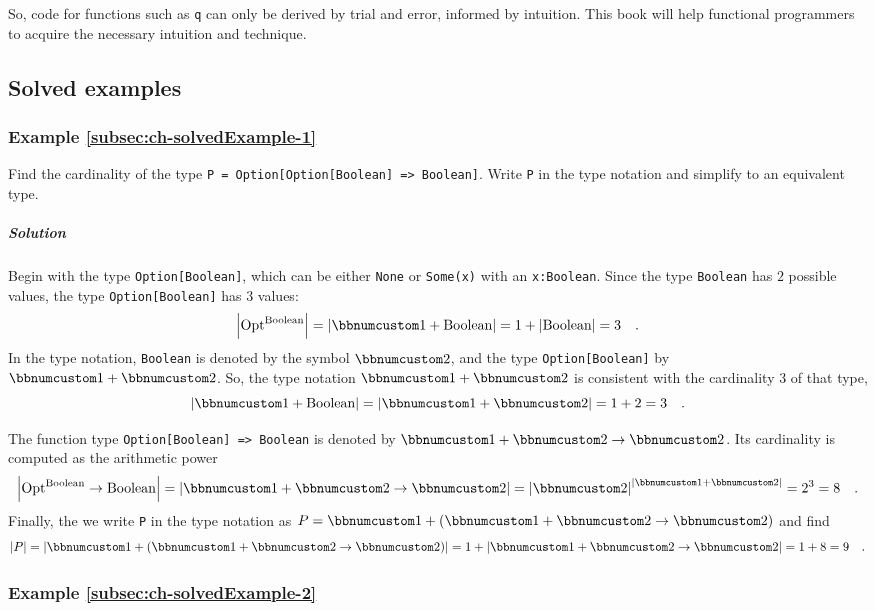 So, code for functions such as \lstinline!q! can only be derived
by trial and error, informed by intuition. This book will help functional
programmers to acquire the necessary intuition and technique.

\subsection{Solved examples}

\subsubsection{Example \label{subsec:ch-solvedExample-1}\ref{subsec:ch-solvedExample-1}}

Find the cardinality of the type \lstinline!P = Option[Option[Boolean] => Boolean]!.
Write \lstinline!P! in the type notation and simplify to an equivalent
type.

\subparagraph{Solution}

Begin with the type \lstinline!Option[Boolean]!, which can be either
\lstinline!None! or \lstinline!Some(x)! with an \lstinline!x:Boolean!.
Since the type \lstinline!Boolean! has $2$ possible values, the
type \lstinline!Option[Boolean]! has $3$ values:
\[
\left|\text{Opt}^{\text{Boolean}}\right|=\left|\bbnum 1+\text{Boolean}\right|=1+\left|\text{Boolean}\right|=3\quad.
\]
In the type notation, \lstinline!Boolean! is denoted by the symbol
$\bbnum 2$, and the type \lstinline!Option[Boolean]! by $\bbnum 1+\bbnum 2$.
So, the type notation $\bbnum 1+\bbnum 2$ is consistent with the
cardinality $3$ of that type,
\[
\left|\bbnum 1+\text{Boolean}\right|=\left|\bbnum 1+\bbnum 2\right|=1+2=3\quad.
\]

The function type \lstinline!Option[Boolean] => Boolean! is denoted
by $\bbnum 1+\bbnum 2\rightarrow\bbnum 2$. Its cardinality is computed
as the arithmetic power 
\[
\left|\text{Opt}^{\text{Boolean}}\rightarrow\text{Boolean}\right|=\left|\bbnum 1+\bbnum 2\rightarrow\bbnum 2\right|=\left|\bbnum 2\right|^{\left|\bbnum 1+\bbnum 2\right|}=2^{3}=8\quad.
\]
Finally, the we write \lstinline!P! in the type notation as $P=\bbnum 1+\left(\bbnum 1+\bbnum 2\rightarrow\bbnum 2\right)$
and find 
\[
\left|P\right|=\left|\bbnum 1+\left(\bbnum 1+\bbnum 2\rightarrow\bbnum 2\right)\right|=1+\left|\bbnum 1+\bbnum 2\rightarrow\bbnum 2\right|=1+8=9\quad.
\]


\subsubsection{Example \label{subsec:ch-solvedExample-2}\ref{subsec:ch-solvedExample-2}}

